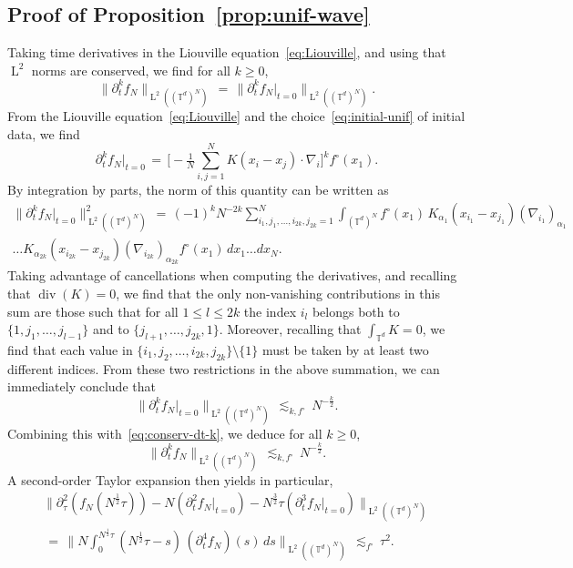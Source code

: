 \documentclass[a4paper,11pt,reqno,noindent]{amsart}
\theoremstyle{plain}
\numberwithin{equation}{section}
\newcommand{\T}{\mathbb T}
\newcommand{\Div}{{\operatorname{div}}}
\newcommand{\3}{|\!|\!|}
\newcommand{\Ld}{\operatorname{L}}
\begin{document}
\subsection{Proof of Proposition~\ref{prop:unif-wave}}\label{sec:proof-unif-wave}
Taking time derivatives in the Liouville equation~\eqref{eq:Liouville}, and using that $\Ld^2$ norms are conserved, we find for all $k\ge0$,
\begin{equation}\label{eq:conserv-dt-k}
\|\partial_t^kf_N\|_{\Ld^2((\T^d)^N)}\,=\,\|\partial_t^kf_N|_{t=0}\|_{\Ld^2((\T^d)^N)}.
\end{equation}
From the Liouville equation~\eqref{eq:Liouville} and the choice~\eqref{eq:initial-unif} of initial data, we find
\begin{equation}\label{eq:dtkfN-0}
\partial_t^kf_N|_{t=0}\,=\,\bigg[-\tfrac1N\sum_{i,j=1}^NK(x_i-x_j)\cdot\nabla_i\bigg]^kf^{\circ}(x_1).
\end{equation}
By integration by parts, the norm of this quantity can be written as
\begin{multline*}
\|\partial_t^kf_N|_{t=0}\|_{\Ld^2((\T^d)^N)}^2
\,=\,(-1)^{k}N^{-2k}\sum_{i_1,j_1,\ldots,i_{2k},j_{2k}=1}^N\int_{(\T^d)^N} f^{\circ}(x_1)\,K_{\alpha_1}(x_{i_1}-x_{j_1})(\nabla_{i_1})_{\alpha_1}\\
\ldots K_{\alpha_{2k}}(x_{i_{2k}}-x_{j_{2k}})(\nabla_{i_{2k}})_{\alpha_{2k}}f^{\circ}(x_1)\,dx_1\ldots dx_N.
\end{multline*}
Taking advantage of cancellations when computing the derivatives, and recalling that \mbox{$\Div(K)=0$}, we find that the only non-vanishing contributions in this sum are those such that for all $1\le l\le 2k$ the index $i_l$ belongs both to $\{1,j_1,\ldots,j_{l-1}\}$ and to $\{j_{l+1},\ldots,j_{2k},1\}$.
Moreover, recalling that $\int_{\T^d}K=0$, we find that each value in \mbox{$\{i_1,j_2,\ldots,i_{2k},j_{2k}\}\setminus\{1\}$} must be taken by at least two different indices. From these two restrictions in the above summation, we can immediately conclude that
\begin{equation*}
\|\partial_t^kf_N|_{t=0}\|_{\Ld^2((\T^d)^N)}\,\lesssim_{k,f^\circ}\,N^{-\frac k2}.
\end{equation*}
Combining this with~\eqref{eq:conserv-dt-k}, we deduce for all $k\ge0$,
\begin{equation}\label{eq:estim-dt-k}
\|\partial_t^kf_N\|_{\Ld^2((\T^d)^N)}\,\lesssim_{k,f^\circ}\,N^{-\frac k2}.
\end{equation}
A second-order Taylor expansion then yields in particular,
\begin{multline*}
{\big\|\partial_\tau^2(f_N(N^{\frac12}\tau))-N(\partial_t^2f_N|_{t=0})-N^\frac32\tau(\partial_t^3f_N|_{t=0})\big\|_{\Ld^2((\T^d)^N)}}\\
\,=\,\Big\|N\int_0^{N^\frac12\tau}(N^\frac12\tau-s)\,(\partial_t^4f_N)(s)\,ds\Big\|_{\Ld^2((\T^d)^N)}
\,\lesssim_{f^\circ}\,\tau^2.
\end{multline*}
\end{document}
